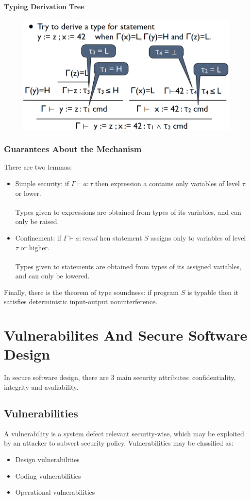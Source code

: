 \documentclass[10pt,a4paper]{report}
\begin{document}
\subsubsection{Typing Derivation Tree}
\begin{figure}[H]
\centering
\includegraphics[scale=0.4]{24.png}
\end{figure}
\subsection{Guarantees About the Mechanism}
There are two lemmas:
\begin{itemize}
\item Simple security: if $\Gamma \vdash a: \tau$ then expression a contains only variables of level $\tau$ or lower.\\
\\
Types given to expressions are obtained from types of its variables, and can only be raised.
\item Confinement: if $\Gamma \vdash a: \tau cmd$ hen statement $S$ assigns only to variables of level $\tau$ or higher.\\
\\
Types given to statements are obtained from types of its assigned variables, and can only be lowered.
\end{itemize}
Finally, there is the theorem of type soundness: if program $S$ is typable then it satisfies deterministic input-output noninterference.

\chapter{Vulnerabilites And Secure Software Design}
In secure software design, there are 3 main security attributes: confidentiality, integrity and avaliability.
\section{Vulnerabilities}
A vulnerability is a system defect relevant security-wise, which may be exploited by an attacker to subvert security policy. Vulnerabilities may be classified as:
\begin{itemize}
\item Design vulnerabilities
\item Coding vulnerabilities
\item Operational vulnerabilities
\end{itemize}
\end{document}
